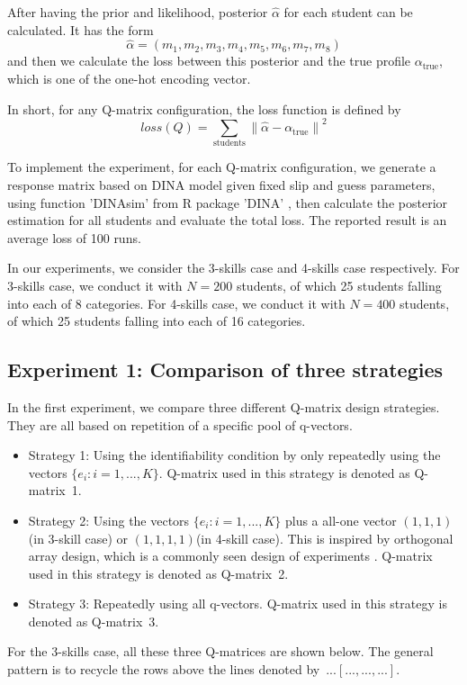\documentclass{edm_template}
\begin{document}
After having the prior and likelihood, posterior $\hat{\alpha}$ for each student can be calculated. It has the form
$$\hat{\alpha} = (m_1,m_2,m_3,m_4,m_5,m_6,m_7,m_8)$$ 
and then we calculate the loss between this posterior and the true profile $\alpha_{\mathrm{true}}$, which is one of the one-hot encoding vector. 

In short, for any Q-matrix configuration, the loss function is defined by
\newcommand\norm[1]{\left\lVert#1\right\rVert}
$$ loss(Q) = \sum_{\mathrm{students}} \norm{\hat{\alpha} - \alpha_{\mathrm{true}}}^2$$ 

To implement the experiment, for each Q-matrix configuration, we generate a response matrix based on DINA model given fixed slip and guess parameters, using function 'DINAsim' from R package 'DINA' \cite{Culpepper2015}, then calculate the posterior estimation for all students and evaluate the total loss. The reported result is an average loss of 100 runs. 

In our experiments, we consider the 3-skills case and 4-skills case respectively. For 3-skills case, we conduct it with $N=200$ students, of which 25 students falling into each of 8 categories. For 4-skills case, we conduct it with $N=400$ students, of which 25 students falling into each of 16 categories. 

\subsection{Experiment 1: Comparison of three strategies}
In the first experiment, we compare three different Q-matrix design strategies. They are all based on repetition of a specific pool of q-vectors.
\begin{itemize}
\item Strategy 1: Using the identifiability condition by only repeatedly using the vectors $\{e_{i}:i=1,...,K\}$. Q-matrix used in this strategy is denoted as Q-matrix~1.
\item Strategy 2: Using the vectors $\{e_{i}:i=1,...,K\}$ plus a all-one vector $(1,1,1)$(in 3-skill case) or $(1,1,1,1)$(in 4-skill case). This is inspired by orthogonal array design, which is a commonly seen design of experiments \cite{montgomery2017design}. Q-matrix used in this strategy is denoted as Q-matrix~2.
\item Strategy 3: Repeatedly using all q-vectors. Q-matrix used in this strategy is denoted as Q-matrix~3.
\end{itemize}
For the 3-skills case, all these three Q-matrices are shown below. The general pattern is to recycle the rows above the lines denoted by~$... [..., ..., ...]$.
\end{document}

